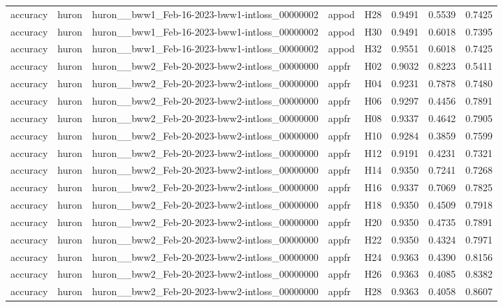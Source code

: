 \begin{table}[tbp]
\begin{tabular}{lllllrrr}
accuracy & huron & huron\_\_bww1\_Feb-16-2023-bww1-intloss\_00000002 & appod & H28 & 0.9491 & 0.5539 & 0.7425 \\
accuracy & huron & huron\_\_bww1\_Feb-16-2023-bww1-intloss\_00000002 & appod & H30 & 0.9491 & 0.6018 & 0.7395 \\
accuracy & huron & huron\_\_bww1\_Feb-16-2023-bww1-intloss\_00000002 & appod & H32 & 0.9551 & 0.6018 & 0.7425 \\
accuracy & huron & huron\_\_bww2\_Feb-20-2023-bww2-intloss\_00000000 & appfr & H02 & 0.9032 & 0.8223 & 0.5411 \\
accuracy & huron & huron\_\_bww2\_Feb-20-2023-bww2-intloss\_00000000 & appfr & H04 & 0.9231 & 0.7878 & 0.7480 \\
accuracy & huron & huron\_\_bww2\_Feb-20-2023-bww2-intloss\_00000000 & appfr & H06 & 0.9297 & 0.4456 & 0.7891 \\
accuracy & huron & huron\_\_bww2\_Feb-20-2023-bww2-intloss\_00000000 & appfr & H08 & 0.9337 & 0.4642 & 0.7905 \\
accuracy & huron & huron\_\_bww2\_Feb-20-2023-bww2-intloss\_00000000 & appfr & H10 & 0.9284 & 0.3859 & 0.7599 \\
accuracy & huron & huron\_\_bww2\_Feb-20-2023-bww2-intloss\_00000000 & appfr & H12 & 0.9191 & 0.4231 & 0.7321 \\
accuracy & huron & huron\_\_bww2\_Feb-20-2023-bww2-intloss\_00000000 & appfr & H14 & 0.9350 & 0.7241 & 0.7268 \\
accuracy & huron & huron\_\_bww2\_Feb-20-2023-bww2-intloss\_00000000 & appfr & H16 & 0.9337 & 0.7069 & 0.7825 \\
accuracy & huron & huron\_\_bww2\_Feb-20-2023-bww2-intloss\_00000000 & appfr & H18 & 0.9350 & 0.4509 & 0.7918 \\
accuracy & huron & huron\_\_bww2\_Feb-20-2023-bww2-intloss\_00000000 & appfr & H20 & 0.9350 & 0.4735 & 0.7891 \\
accuracy & huron & huron\_\_bww2\_Feb-20-2023-bww2-intloss\_00000000 & appfr & H22 & 0.9350 & 0.4324 & 0.7971 \\
accuracy & huron & huron\_\_bww2\_Feb-20-2023-bww2-intloss\_00000000 & appfr & H24 & 0.9363 & 0.4390 & 0.8156 \\
accuracy & huron & huron\_\_bww2\_Feb-20-2023-bww2-intloss\_00000000 & appfr & H26 & 0.9363 & 0.4085 & 0.8382 \\
accuracy & huron & huron\_\_bww2\_Feb-20-2023-bww2-intloss\_00000000 & appfr & H28 & 0.9363 & 0.4058 & 0.8607 \\

\end{tabular}
\end{table}
